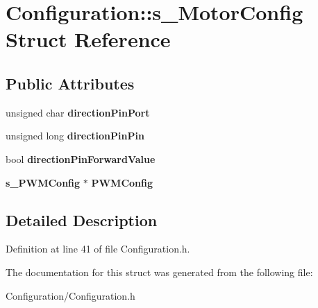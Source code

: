 \section{Configuration\+:\+:s\+\_\+\+Motor\+Config Struct Reference}
\label{struct_configuration_1_1s___motor_config}
\subsection*{Public Attributes}
\begin{DoxyCompactItemize}
\item 
unsigned char {\bfseries direction\+Pin\+Port}\label{struct_configuration_1_1s___motor_config_aeb1251517767de2ef27cef8e4835071a}

\item 
unsigned long {\bfseries direction\+Pin\+Pin}\label{struct_configuration_1_1s___motor_config_a8e6b8a3237ca692f5a996c45c4b405c3}

\item 
bool {\bfseries direction\+Pin\+Forward\+Value}\label{struct_configuration_1_1s___motor_config_af2f3c6ccff7abe580e71e3665edb00d3}

\item 
{\bf s\+\_\+\+P\+W\+M\+Config} $\ast$ {\bfseries P\+W\+M\+Config}\label{struct_configuration_1_1s___motor_config_a5e509e66b849124d99bb00165a489ac6}

\end{DoxyCompactItemize}


\subsection{Detailed Description}


Definition at line 41 of file Configuration.\+h.



The documentation for this struct was generated from the following file\+:\begin{DoxyCompactItemize}
\item 
Configuration/Configuration.\+h\end{DoxyCompactItemize}
